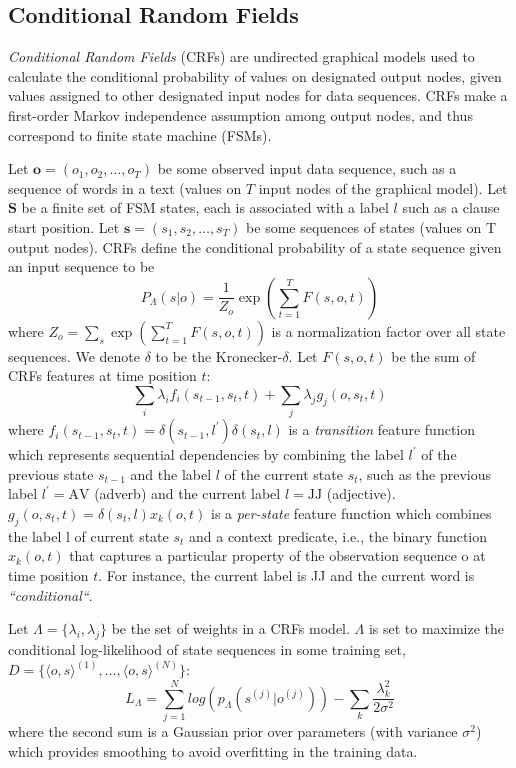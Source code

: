\documentclass[english]{jnlp_1.4}
\begin{document}
\subsection{Conditional Random Fields}
\label{sect:pdf} 
\textit{Conditional Random Fields} (CRFs)
\cite{Lafferty2001} are undirected graphical models used to
calculate the conditional probability of values on designated output
nodes, given values assigned to other designated input nodes for
data sequences. CRFs make a first-order Markov independence
assumption among output nodes, and thus correspond to finite state
machine (FSMs).

Let $\boldsymbol{o} = (o_1,o_2,\dots,o_T)$ be some observed input data
sequence, such as a sequence of words in a text (values on $T$
input nodes of the graphical model). Let $\boldsymbol{S}$ be a finite set
of FSM states, each is associated with a label $l$ such as a
clause start position. Let $\boldsymbol{s} = (s_1,s_2,\dots,s_T)$ be
some sequences of states (values on T output nodes). CRFs define
the conditional probability of a state sequence given an input
\pagebreak
sequence to be
\begin{equation}
 P_\Lambda(s|o) = \frac{1}{Z_o} \exp\left(\sum_{t=1}^TF(s,
 o,t)\right)
\end{equation}
where $Z_o = \sum_{s}\exp\left(\sum_{t=1}^TF(s,o,t)\right)$
is a normalization factor over all state sequences. We denote
$\delta$ to be the Kronecker-$\delta$. Let $F(s,o,t)$ be the sum of
CRFs features at time position $t$:
\begin{equation}
\sum_{i}\lambda_if_i(s_{t-1},s_t,t)+\sum_{j}\lambda_jg_j(o,s_t,t)
\end{equation}
where $f_i(s_{t-1},s_t,t)=
\delta(s_{t-1},l^{'})\delta(s_t,l)$ is a \emph{transition} feature
function which represents sequential dependencies by combining the
label $l^{'}$ of the previous state $s_{t-1}$ and the label $l$ of
the current state $s_t$, such as the previous label $l^{'} = \text{AV}$
(adverb) and the current label $l = \text{JJ}$ (adjective).
$g_j(o,s_t,t)=\delta(s_t,l)x_k(o,t)$ is a \emph{per-state} feature
function which combines the label l of current state $s_t$ and a
context predicate, i.e., the binary function $x_k(o,t)$ that
captures a particular property of the observation sequence o at time
position $t$. For instance, the current label is JJ and the current
word is \emph{``conditional``}.


Let $\Lambda = \{\lambda_i, \lambda_j\}$ be the set of weights in a
CRFs model. $\Lambda$ is set to maximize the conditional
log-likelihood of state sequences in some training set, $D =
\{\langle o,s \rangle^{(1)},\dots,\langle o,s \rangle^{(N)} \}$:
\begin{equation}
 L_\Lambda=\sum_{j=1}^Nlog\left(p_\Lambda(s^{(j)}|o^{(j)})
	\right)-\sum_{k}\frac{\lambda_k^2}{2\sigma^2}
\end{equation}
where the second sum is a Gaussian prior over parameters
(with variance $\sigma^2$) which provides smoothing to avoid
overfitting in the training data.
\end{document}
